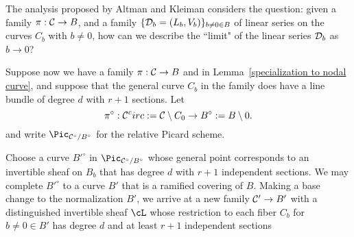 The analysis proposed by Altman and Kleiman considers the question: given a family $\pi : \cC \to B$, and a family $\{ \cD_b = (L_b, V_b)\}_{b \neq 0 \in B}$ of linear series on the curves $C_b$ with $b \neq 0$, how can we describe the ``limit" of the linear series $\cD_b$ as $b \to 0$? 

Suppose now we have a family $\pi : \cC \to B$ and in Lemma~\ref{specialization to nodal curve}, and suppose that the general curve $C_b$ in the family does have a line bundle  of degree $d$ with $r+1$ sections. Let 
$$
\pi^\circ: \cC^circ := \cC \setminus C_0\to B^\circ := B\setminus 0.
$$
and write $\Pic_{\cC^\circ/B^\circ}$ for the relative Picard scheme.

Choose a curve $B'^\circ$ in $\Pic_{\cC^\circ/B^\circ}$ whose general point corresponds
to an invertible sheaf on $B_b$ that has degree $d$ with $r+1$ independent sections.  We may complete $B'^\circ$ to a curve $B'$ that is a ramified covering of $B$. Making a base change to the normalization $B'$,  we arrive at a new family $\cC'\to B'$ with a distinguished invertible sheaf $\cL$ whose restriction to each fiber $C_b$ for $b \neq 0 \in B'$ has degree $d$ and at least $r+1$ independent sections 


%
%
%

%
%

